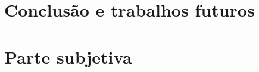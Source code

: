 \documentclass[a4paper, 12pt, twoside]{book}
\begin{document}
\chapter{Conclusão e trabalhos futuros} \label{ch:conclusao}

\chapter{Parte subjetiva} \label{ch:subjetiva}



\end{document}
